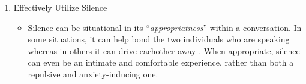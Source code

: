 \documentclass[stu,12pt]{apa7}
\begin{document}
\begin{enumerate}
        \item Effectively Utilize Silence
          \begin{itemize}
            \item Silence can be situational in its ``\textit{appropriatness}''
              within a conversation. In some situations, it can help bond the
              two individuals who are speaking whereas in others it can
              drive eachother away
              \parencite[pp. 600]{gerd_antos_handbook_2008}. When appropriate,
              silence can even be an intimate and comfortable experience, rather
              than both a repulsive and anxiety-inducing one.
          \end{itemize}
      \end{enumerate}


  \newpage
  \printbibliography[%
    title={Works Cited},%
    heading={bibintoc},%
    notcategory={consulted}%
  ]

  \newpage
  \nocite{*}
  \printbibliography[%
    title={Works Consulted},%
    heading={bibintoc},%
    category={consulted}%
  ]
\end{document}
